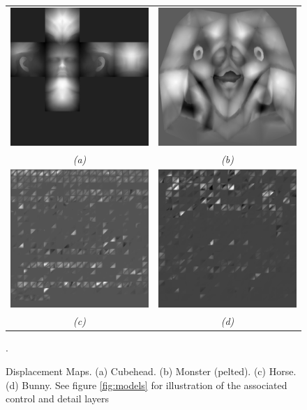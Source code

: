 \begin{figure}
\begin{center}
\begin{tabular}{cc}
\includegraphics[width=6cm]{../images/dispmap_cubehead} &
\includegraphics[width=6cm]{../images/dispmap_dinohead} \\
{\it (a)} & {\it (b)} \\
\includegraphics[width=6cm]{../images/dispmap_horse} &
\includegraphics[width=6cm]{../images/dispmap_bunny} \\
{\it (c)} & {\it (d)}
\end{tabular}
\caption[Displacement Maps]{\label{fig:dispmapresults} Displacement Maps. (a) Cubehead. (b) Monster (pelted). (c) Horse. (d) Bunny. See figure \ref{fig:models} for illustration of the associated control and detail layers}.
\end{center}
\end{figure}

